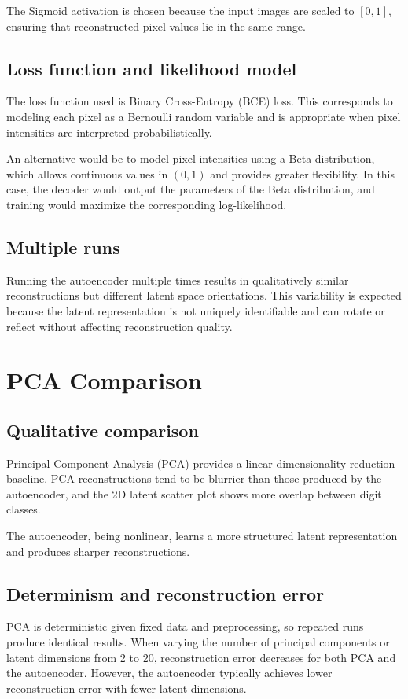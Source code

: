 \documentclass[11pt,a4paper]{article}
\begin{document}
The Sigmoid activation is chosen because the input images are scaled to $[0,1]$, ensuring that reconstructed pixel values lie in the same range.

\subsection{Loss function and likelihood model}
The loss function used is Binary Cross-Entropy (BCE) loss. This corresponds to modeling each pixel as a Bernoulli random variable and is appropriate when pixel intensities are interpreted probabilistically.

An alternative would be to model pixel intensities using a Beta distribution, which allows continuous values in $(0,1)$ and provides greater flexibility. In this case, the decoder would output the parameters of the Beta distribution, and training would maximize the corresponding log-likelihood.

\subsection{Multiple runs}
Running the autoencoder multiple times results in qualitatively similar reconstructions but different latent space orientations. This variability is expected because the latent representation is not uniquely identifiable and can rotate or reflect without affecting reconstruction quality.

\section{PCA Comparison}

\subsection{Qualitative comparison}
Principal Component Analysis (PCA) provides a linear dimensionality reduction baseline. PCA reconstructions tend to be blurrier than those produced by the autoencoder, and the 2D latent scatter plot shows more overlap between digit classes.

The autoencoder, being nonlinear, learns a more structured latent representation and produces sharper reconstructions.

\subsection{Determinism and reconstruction error}
PCA is deterministic given fixed data and preprocessing, so repeated runs produce identical results. When varying the number of principal components or latent dimensions from 2 to 20, reconstruction error decreases for both PCA and the autoencoder. However, the autoencoder typically achieves lower reconstruction error with fewer latent dimensions.
\end{document}
